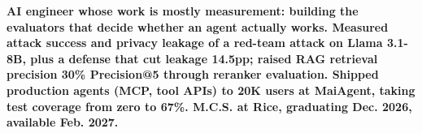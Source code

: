 \item\small{\textbf{AI engineer whose work is mostly measurement: building the evaluators that decide whether an agent actually works. Measured attack success and privacy leakage of a red-team attack on Llama 3.1-8B, plus a defense that cut leakage \textbf{14.5pp}; raised RAG retrieval precision \textbf{30\% Precision@5} through reranker evaluation. Shipped production agents (MCP, tool APIs) to \textbf{20K} users at MaiAgent, taking test coverage from \textbf{zero to 67\%}. M.C.S. at Rice, graduating Dec. 2026, available Feb. 2027.}}%
